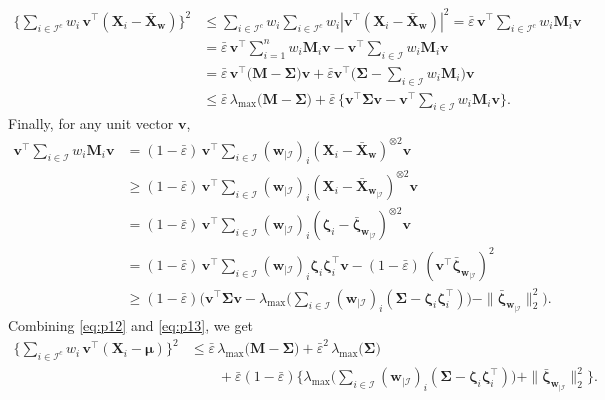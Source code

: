 \documentclass[aos,preprint,reqno]{imsart}
\newcommand\bs{\boldsymbol}
\newcommand\bmu{\boldsymbol\mu}
\newcommand\bzeta{\boldsymbol\zeta}
\newcommand\bSigma{\boldsymbol\Sigma}
\newcommand\bv{\boldsymbol v}
\newcommand\bw{\boldsymbol w}
\theoremstyle{plain}
\theoremstyle{remark}
\begin{document}
	\begin{align}
			\bigg\{\sum_{i\in\mathcal I^c} w_i\,\bv^\top(\bs X_i-\bar{\bs X}_{\bw})\bigg\}^2
			&\le \sum_{i\in\mathcal I^c} w_i\sum_{i\in\mathcal I^c} w_i|
				\bv^\top(\bs X_i-\bar{\bs X}_{\bw})|^2
			=\bar\varepsilon\, \bv^\top\sum_{i\in\mathcal I^c} w_i\mathbf{M}_i\bv\\
			&=\bar\varepsilon\,\bv^\top\sum_{i=1}^n w_i\mathbf{M}_i\bv-
			\bv^\top\sum_{i\in\mathcal I} w_i\mathbf{M}_i\bv\\
			&={\bar\varepsilon}\,\bv^\top\big(\mathbf{M} - \bSigma\big)\bv +
			{\bar\varepsilon}\bv^\top\Big(\bSigma-\sum_{i\in\mathcal I} w_i
			\mathbf{M}_i\Big)\bv\\
			&\le \bar\varepsilon\,\lambda_{\max}\big( \mathbf{M}-\bSigma\big)
			+ \bar\varepsilon\,\Big\{\bv^\top\bSigma\bv - 
			\bv^\top\sum_{i\in\mathcal I} w_i\mathbf{M}_i\bv\Big\}.
			\label{eq:p12}
	\end{align}
	Finally, for any unit vector $\bv$,
	\begin{align}
			\bv^\top\sum_{i\in\mathcal I} w_i\mathbf{M}_i \bv &= (1-\bar\varepsilon)
			\,\bv^\top\sum_{i\in\mathcal I} (\bw_{|\mathcal I})_i(\bs X_i-\bar{\bs X}_{\bw})^{\otimes 2}\bv\\
			&\ge(1-\bar\varepsilon)\,\bv^\top\sum_{i\in\mathcal I} (\bw_{|\mathcal I})_i
			(\bs X_i-\bar{\bs X}_{\bw_{|\mathcal I}})^{\otimes 2}\bv\\
			& = (1-\bar\varepsilon)\,\bv^\top\sum_{i\in\mathcal I} (\bw_{|\mathcal I})_i
			(\bzeta_i-\bar{\bzeta}_{\bw_{|\mathcal I}})^{\otimes 2}\bv\\
			&= (1-\bar\varepsilon)\,\bv^\top\sum_{i\in\mathcal I} (\bw_{|\mathcal I})_i
				\bzeta_i\bzeta_i^\top\bv-(1-\bar\varepsilon)\,
				(\bv^\top\bar{\bzeta}_{\bw_{|\mathcal I}})^2\\
			&\ge (1 -\bar\varepsilon)\bigg(\bv^\top\bSigma\bv - \lambda_{\max}
				\bigg(\sum_{i\in\mathcal I} (\bw_{|\mathcal I})_i (\bSigma-
				\bzeta_i\bzeta_i^\top)\bigg) - \|\bar{\bzeta}_{\bw_{|\mathcal I}}\|_2^2
				\bigg).
			 \label{eq:p13}
	\end{align}
	Combining \eqref{eq:p12} and \eqref{eq:p13}, we get
	\begin{align}
		\bigg\{\sum_{i\in\mathcal I^c} w_i\,\bv^\top(\bs X_i-\bmu)\bigg\}^2
				&\le \bar\varepsilon\,\lambda_{\max}\big( \mathbf{M}-\bSigma\big)
					+ \bar\varepsilon^2\,\lambda_{\max}\big(\bSigma\big) \\
				&\qquad +\bar\varepsilon(1-\bar\varepsilon)\bigg\{  \lambda_{\max}
					\bigg(\sum_{i\in\mathcal I} (\bw_{|\mathcal I})_i(\bSigma - 
					\bzeta_i\bzeta_i^\top)\bigg)  + 
					\|\bar{\bzeta}_{\bw_{|\mathcal I}}\|_2^2
					\bigg\}.\label{eq:p14}
	\end{align}
\end{document}
